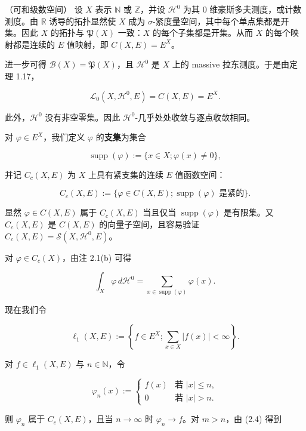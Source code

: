 \begin{example}

（可和级数空间） 设 $ X $ 表示 $ \mathbb{N} $ 或 $ \mathbb{Z} $，并设 $ \mathcal{H}^0 $ 为其 0 维豪斯多夫测度，或计数测度。由 $ \mathbb{R} $ 诱导的拓扑显然使 $ X $ 成为 $ \sigma $-紧度量空间，其中每个单点集都是开集。因此 $ X $ 的拓扑与 $ \mathfrak{P}(X) $ 一致：$ X $ 的每个子集都是开集。从而 $ X $ 的每个映射都是连续的 $ E $ 值映射，即 $ C(X,E) = E^X $。

进一步可得 $ \mathcal{B}(X) = \mathfrak{P}(X) $，且 $ \mathcal{H}^0 $ 是 $ X $ 上的 massive 拉东测度。于是由定理 1.17，

\[
\mathcal{L}_0(X,\mathcal{H}^0,E) = C(X,E) = E^X .
\]

此外，$ \mathcal{H}^0 $ 没有非空零集。因此 $ \mathcal{H}^0 $-几乎处处收敛与逐点收敛相同。

对 $ \varphi \in E^X $，我们定义 $ \varphi $ 的\textbf{支集}为集合

\[
\operatorname{supp}(\varphi) := \{ x \in X ; \varphi(x) \ne 0 \} ,
\]

并记 $ C_c(X,E) $ 为 $ X $ 上具有紧支集的连续 $ E $ 值函数空间：

\[
C_c(X,E) := \{ \varphi \in C(X,E) ; \operatorname{supp}(\varphi) \text{ 是紧的} \} .
\]

显然 $ \varphi \in C(X,E) $ 属于 $ C_c(X,E) $ 当且仅当 $ \operatorname{supp}(\varphi) $ 是有限集。又 $ C_c(X,E) $ 是 $ C(X,E) $ 的向量子空间，且容易验证 $ C_c(X,E) = \mathcal{S}(X,\mathcal{H}^0,E) $。

对 $ \varphi \in C_c(X) $，由注 2.1(b) 可得

\begin{equation}
\int_X \varphi \, d\mathcal{H}^0 = \sum_{x \in \operatorname{supp}(\varphi)} \varphi(x) .\tag{2.4}
\end{equation}

现在我们令

\[
\ell_1(X,E) := \left\{ f \in E^X ; \sum_{x \in X} |f(x)| < \infty \right\} .
\]

对 $ f \in \ell_1(X,E) $ 与 $ n \in \mathbb{N} $，令

\begin{equation*}
\varphi_n(x) := \begin{cases} f(x) & \text{若 } |x| \le n , \\ 0 & \text{若 } |x| > n . \end{cases}
\end{equation*}

则 $ \varphi_n $ 属于 $ C_c(X,E) $，且当 $ n \to \infty $ 时 $ \varphi_n \to f $。对 $ m > n $，由 (2.4) 得到


\end{example}
